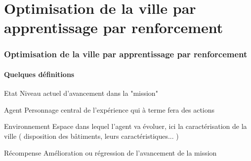 \section[Apprentissage par renforcement]{Optimisation de la ville par apprentissage par renforcement}

\begin{frame}
	\frametitle{Optimisation de la ville par apprentissage par renforcement}
	\framesubtitle{Quelques définitions}

\pause
\begin{exampleblock}{Etat}
Niveau actuel d'avancement dans la "mission"
\end{exampleblock}
\pause
\begin{exampleblock}{Agent}
Personnage central de l'expérience qui à terme fera des actions
\end{exampleblock}
\pause
\begin{exampleblock}{Environnement}
Espace dans lequel l'agent va évoluer, ici la caractérisation de la ville ( disposition des bâtiments, leurs caractéristiques... )
\end{exampleblock}
\pause
\begin{exampleblock}{Récompense}
    Amélioration ou régression de l'avancement de la mission
\end{exampleblock}

\end{frame}

